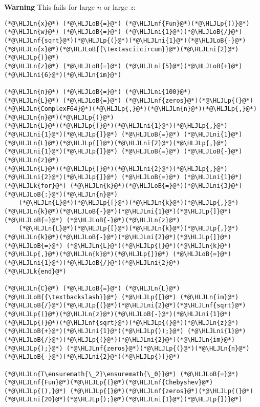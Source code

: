 \documentclass[12pt,landscape]{article}
\newcommand{\HLJLk}[1]{\textcolor[RGB]{148,91,176}{\textbf{#1}}}
\newcommand{\HLJLn}[1]{#1}
\newcommand{\HLJLnf}[1]{\textcolor[RGB]{66,102,213}{#1}}
\newcommand{\HLJLni}[1]{\textcolor[RGB]{59,151,46}{#1}}
\newcommand{\HLJLoB}[1]{\textcolor[RGB]{102,102,102}{\textbf{#1}}}
\newcommand{\HLJLp}[1]{#1}
\begin{document}
{\textbf{Warning} This fails for large $n$ or large $z$:


\begin{lstlisting}
(*@\HLJLn{x}@*) (*@\HLJLoB{=}@*) (*@\HLJLnf{Fun}@*)(*@\HLJLp{()}@*)
(*@\HLJLn{w}@*) (*@\HLJLoB{=}@*) (*@\HLJLni{1}@*)(*@\HLJLoB{/}@*)(*@\HLJLnf{sqrt}@*)(*@\HLJLp{(}@*)(*@\HLJLni{1}@*)(*@\HLJLoB{-}@*)(*@\HLJLn{x}@*)(*@\HLJLoB{{\textasciicircum}}@*)(*@\HLJLni{2}@*)(*@\HLJLp{)}@*)
(*@\HLJLn{z}@*) (*@\HLJLoB{=}@*) (*@\HLJLni{5}@*)(*@\HLJLoB{+}@*)(*@\HLJLni{6}@*)(*@\HLJLn{im}@*)

(*@\HLJLn{n}@*) (*@\HLJLoB{=}@*) (*@\HLJLni{100}@*)
(*@\HLJLn{L}@*) (*@\HLJLoB{=}@*) (*@\HLJLnf{zeros}@*)(*@\HLJLp{(}@*)(*@\HLJLn{ComplexF64}@*)(*@\HLJLp{,}@*)(*@\HLJLn{n}@*)(*@\HLJLp{,}@*)(*@\HLJLn{n}@*)(*@\HLJLp{)}@*)
(*@\HLJLn{L}@*)(*@\HLJLp{[}@*)(*@\HLJLni{1}@*)(*@\HLJLp{,}@*)(*@\HLJLni{1}@*)(*@\HLJLp{]}@*) (*@\HLJLoB{=}@*) (*@\HLJLni{1}@*)
(*@\HLJLn{L}@*)(*@\HLJLp{[}@*)(*@\HLJLni{2}@*)(*@\HLJLp{,}@*)(*@\HLJLni{1}@*)(*@\HLJLp{]}@*) (*@\HLJLoB{=}@*) (*@\HLJLoB{-}@*)(*@\HLJLn{z}@*)
(*@\HLJLn{L}@*)(*@\HLJLp{[}@*)(*@\HLJLni{2}@*)(*@\HLJLp{,}@*)(*@\HLJLni{2}@*)(*@\HLJLp{]}@*) (*@\HLJLoB{=}@*) (*@\HLJLni{1}@*)
(*@\HLJLk{for}@*) (*@\HLJLn{k}@*)(*@\HLJLoB{=}@*)(*@\HLJLni{3}@*)(*@\HLJLoB{:}@*)(*@\HLJLn{n}@*)
    (*@\HLJLn{L}@*)(*@\HLJLp{[}@*)(*@\HLJLn{k}@*)(*@\HLJLp{,}@*)(*@\HLJLn{k}@*)(*@\HLJLoB{-}@*)(*@\HLJLni{1}@*)(*@\HLJLp{]}@*) (*@\HLJLoB{=}@*) (*@\HLJLoB{-}@*)(*@\HLJLn{z}@*)
    (*@\HLJLn{L}@*)(*@\HLJLp{[}@*)(*@\HLJLn{k}@*)(*@\HLJLp{,}@*)(*@\HLJLn{k}@*)(*@\HLJLoB{-}@*)(*@\HLJLni{2}@*)(*@\HLJLp{]}@*) (*@\HLJLoB{=}@*) (*@\HLJLn{L}@*)(*@\HLJLp{[}@*)(*@\HLJLn{k}@*)(*@\HLJLp{,}@*)(*@\HLJLn{k}@*)(*@\HLJLp{]}@*) (*@\HLJLoB{=}@*) (*@\HLJLni{1}@*)(*@\HLJLoB{/}@*)(*@\HLJLni{2}@*)
(*@\HLJLk{end}@*)

(*@\HLJLn{C}@*) (*@\HLJLoB{=}@*) (*@\HLJLn{L}@*) (*@\HLJLoB{{\textbackslash}}@*) (*@\HLJLp{[}@*) (*@\HLJLn{im}@*)(*@\HLJLoB{/}@*)(*@\HLJLp{(}@*)(*@\HLJLni{2}@*)(*@\HLJLnf{sqrt}@*)(*@\HLJLp{(}@*)(*@\HLJLn{z}@*)(*@\HLJLoB{-}@*)(*@\HLJLni{1}@*)(*@\HLJLp{)}@*)(*@\HLJLnf{sqrt}@*)(*@\HLJLp{(}@*)(*@\HLJLn{z}@*)(*@\HLJLoB{+}@*)(*@\HLJLni{1}@*)(*@\HLJLp{));}@*) (*@\HLJLni{1}@*)(*@\HLJLoB{/}@*)(*@\HLJLp{(}@*)(*@\HLJLni{2}@*)(*@\HLJLn{im}@*)(*@\HLJLp{);}@*) (*@\HLJLnf{zeros}@*)(*@\HLJLp{(}@*)(*@\HLJLn{n}@*)(*@\HLJLoB{-}@*)(*@\HLJLni{2}@*)(*@\HLJLp{)]}@*)

(*@\HLJLn{T\ensuremath{\_2}\ensuremath{\_0}}@*) (*@\HLJLoB{=}@*) (*@\HLJLnf{Fun}@*)(*@\HLJLp{(}@*)(*@\HLJLnf{Chebyshev}@*)(*@\HLJLp{(),}@*) (*@\HLJLp{[}@*)(*@\HLJLnf{zeros}@*)(*@\HLJLp{(}@*)(*@\HLJLni{20}@*)(*@\HLJLp{);}@*)(*@\HLJLni{1}@*)(*@\HLJLp{])}@*)


\end{lstlisting}}
\end{document}
